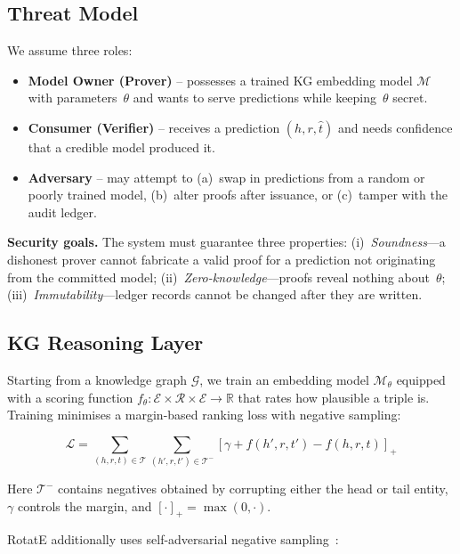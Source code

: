\documentclass[conference, 10pt]{IEEEtran}
\newcommand{\R}{\mathbb{R}}
\begin{document}
\subsection{Threat Model}

We assume three roles:

\begin{itemize}
    \item \textbf{Model Owner (Prover)} -- possesses a trained KG embedding model $\mathcal{M}$ with parameters~$\theta$ and wants to serve predictions while keeping~$\theta$ secret.
    \item \textbf{Consumer (Verifier)} -- receives a prediction $(h, r, \hat{t})$ and needs confidence that a credible model produced it.
    \item \textbf{Adversary} -- may attempt to (a)~swap in predictions from a random or poorly trained model, (b)~alter proofs after issuance, or (c)~tamper with the audit ledger.
\end{itemize}

\textbf{Security goals.} The system must guarantee three properties: (i)~\emph{Soundness}---a dishonest prover cannot fabricate a valid proof for a prediction not originating from the committed model; (ii)~\emph{Zero-knowledge}---proofs reveal nothing about~$\theta$; (iii)~\emph{Immutability}---ledger records cannot be changed after they are written.

\subsection{KG Reasoning Layer}
\label{subsec:kg_layer}

Starting from a knowledge graph $\mathcal{G}$, we train an embedding model $\mathcal{M}_\theta$ equipped with a scoring function $f_\theta: \mathcal{E} \times \mathcal{R} \times \mathcal{E} \to \R$ that rates how plausible a triple is. Training minimises a margin-based ranking loss with negative sampling:

\begin{equation}
    \mathcal{L} = \sum_{(h,r,t) \in \mathcal{T}} \sum_{(h',r,t') \in \mathcal{T}^-} \left[\gamma + f(h', r, t') - f(h, r, t)\right]_+
    \label{eq:margin_loss}
\end{equation}

Here $\mathcal{T}^-$ contains negatives obtained by corrupting either the head or tail entity, $\gamma$ controls the margin, and $[\cdot]_+ = \max(0, \cdot)$.

RotatE additionally uses self-adversarial negative sampling~\cite{sun2019rotate}:
\end{document}
